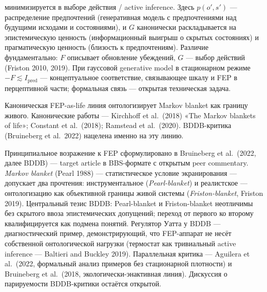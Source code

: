 \documentclass[pdflatex,sn-mathphys-ay]{sn-jnl}
\begin{document}
минимизируется в выборе действия / active inference. Здесь \(p(o', s')\) --- распределение предпочтений (генеративная модель с предпочтениями над будущими исходами и состояниями), и \(G\) канонически раскладывается на эпистемическую ценность (информационный выигрыш о скрытых состояниях) и прагматическую ценность (близость к предпочтениям). Различие фундаментально: \(F\) описывает обновление убеждений, \(G\) --- выбор действий (Friston 2010, 2019). При гауссовой generative model в стационарном режиме \(-F \lesssim I_{\text{pred}}\) --- концептуальное соответствие, связывающее шкалу и FEP в перцептивной части; формальная связь --- открытая техническая задача.

Каноническая FEP-as-life линия онтологизирует Markov blanket как границу живого. Канонические работы --- Kirchhoff et al.~(2018) «The Markov blankets of life»; Constant et al.~(2018); Ramstead et al.~(2020). BDDB-критика (Bruineberg et al.~2022) нацелена именно на эту линию.

Принципиальное возражение к FEP сформулировано в Bruineberg et al.~(2022, далее BDDB) --- target article в BBS-формате с открытым peer commentary. \emph{Markov blanket} (Pearl 1988) --- статистическое условие экранирования --- допускает два прочтения: инструментальное (\emph{Pearl-blanket}) и реалистское --- онтологизацию как объективной границы живой системы (\emph{Friston-blanket}, Friston 2019). Центральный тезис BDDB: Pearl-blanket и Friston-blanket неотличимы без скрытого ввоза эпистемических допущений; переход от первого ко второму квалифицируется как подмена понятий. Регулятор Уатта у BDDB --- диагностический пример, демонстрирующий, что FEP-аппарат не несёт собственной онтологической нагрузки (термостат как тривиальный active inference --- Baltieri and Buckley 2019). Параллельная критика --- Aguilera et al.~(2022, формальный анализ примеров без стационарной плотности) и Bruineberg et al.~(2018, экологически-энактивная линия). Дискуссия о парируемости BDDB-критики остаётся открытой.
\end{document}
